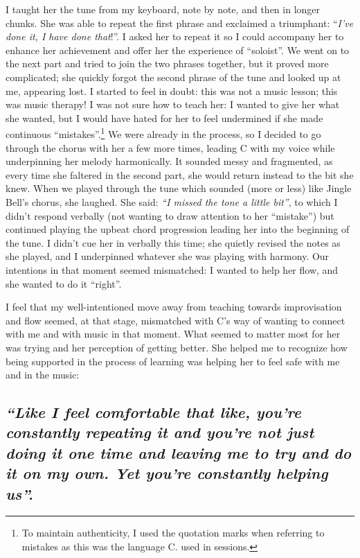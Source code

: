 \documentclass[authordate, empirical]{jote-new-article}
\begin{document}
I taught her the tune from my keyboard, note by note, and then in longer chunks. She was able to repeat the first phrase and exclaimed a triumphant: “\emph{I've done it, I have done that}!”. I asked her to repeat it so I could accompany her to enhance her achievement and offer her the experience of “soloist”. We went on to the next part and tried to join the two phrases together, but it proved more complicated; she quickly forgot the second phrase of the tune and looked up at me, appearing lost. I started to feel in doubt: this was not a music lesson; this was music therapy! I was not sure how to teach her: I wanted to give her what she wanted, but I would have hated for her to feel undermined if she made continuous “mistakes”.\footnote{ To maintain authenticity, I used the quotation marks when referring to mistakes as this was the language C. used in sessions.} We were already in the process, so I decided to go through the chorus with her a few more times, leading C with my voice while underpinning her melody harmonically. It sounded messy and fragmented, as every time she faltered in the second part, she would return instead to the bit she knew. When we played through the tune which sounded (more or less) like Jingle Bell's chorus, she laughed. She said: \emph{“I missed the tone a little bit”}, to which I didn't respond verbally (not wanting to draw attention to her “mistake”) but continued playing the upbeat chord progression leading her into the beginning of the tune. I didn't cue her in verbally this time; she quietly revised the notes as she played, and I underpinned whatever she was playing with harmony. Our intentions in that moment seemed mismatched: I wanted to help her flow, and she wanted to do it “right”.







I feel that my well-intentioned move away from teaching towards improvisation and flow seemed, at that stage, mismatched with C's way of wanting to connect with me and with music in that moment. What seemed to matter most for her was trying\emph{ }and her perception of getting better. She helped me to recognize how being supported in the process of learning was helping her to feel safe with me and in the music:







\subsection{\emph{“Like I feel comfortable that like, you're constantly repeating it and you're not just doing it one time and leaving me to try and do it on my own. Yet you're constantly helping us”.}}
\end{document}
